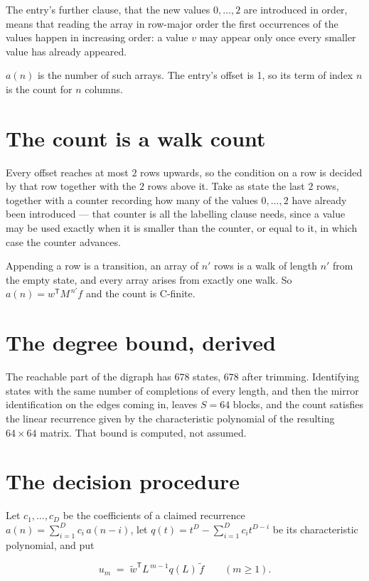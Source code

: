 \documentclass[11pt]{article}
\theoremstyle{definition}
\begin{document}
The entry's further clause, that the new values $0,\dots,2$ are introduced in order, means that reading the array in row-major order the first occurrences of the values happen in increasing order: a value $v$ may appear only once every smaller value has already appeared.

$a(n)$ is the number of such arrays. The entry's offset is 1, so its term of index $n$ is the count for $n$ columns.

\section{The count is a walk count}

Every offset reaches at most $2$ rows upwards, so the condition on a row is decided by that row together with the $2$ rows above it. Take as state the last $2$ rows, together with a counter recording how many of the values $0,\dots,2$ have already been introduced --- that counter is all the labelling clause needs, since a value may be used exactly when it is smaller than the counter, or equal to it, in which case the counter advances.

Appending a row is a transition, an array of $n'$ rows is a walk of length $n'$ from the empty state, and every array arises from exactly one walk. So $a(n) = w^{\mathsf T}M^{\,n'}f$ and the count is C-finite.

\section{The degree bound, derived}

The reachable part of the digraph has $678$ states, $678$ after trimming. Identifying states with the same number of completions of every length, and then the mirror identification on the edges coming in, leaves $S = 64$ blocks, and the count satisfies the linear recurrence given by the characteristic polynomial of the resulting $64\times64$ matrix. That bound is computed, not assumed.

\section{The decision procedure}

Let $c_1,\dots,c_D$ be the coefficients of a claimed recurrence $a(n) = \sum_{i=1}^{D} c_i\,a(n-i)$, let $q(t) = t^{D} - \sum_{i=1}^{D} c_i t^{D-i}$ be its characteristic polynomial, and put

\[u_m \;=\; \tilde w^{\mathsf T} L^{\,m-1} q(L)\,\tilde f \qquad (m \ge 1).\]
\end{document}
